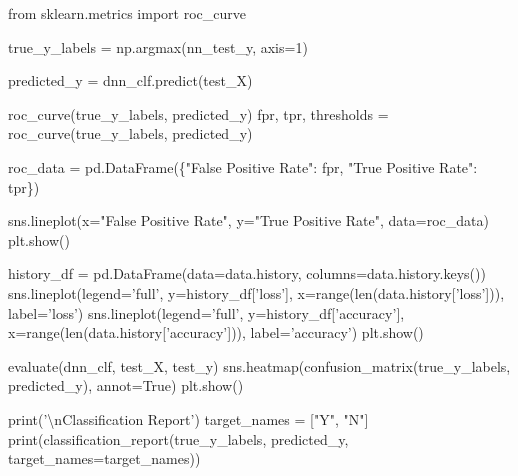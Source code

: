 \documentclass[]{article}
\newenvironment{Shaded}{}{}
\newcommand{\BuiltInTok}[1]{#1}
\newcommand{\CharTok}[1]{\textcolor[rgb]{0.25,0.44,0.63}{#1}}
\newcommand{\DecValTok}[1]{\textcolor[rgb]{0.25,0.63,0.44}{#1}}
\newcommand{\ImportTok}[1]{#1}
\newcommand{\NormalTok}[1]{#1}
\newcommand{\OperatorTok}[1]{\textcolor[rgb]{0.40,0.40,0.40}{#1}}
\newcommand{\StringTok}[1]{\textcolor[rgb]{0.25,0.44,0.63}{#1}}
\newcommand{\VariableTok}[1]{\textcolor[rgb]{0.10,0.09,0.49}{#1}}
\begin{document}
\begin{Shaded}
\begin{Highlighting}[]
\ImportTok{from}\NormalTok{ sklearn.metrics }\ImportTok{import}\NormalTok{ roc_curve}

\NormalTok{true_y_labels }\OperatorTok{=}\NormalTok{ np.argmax(nn_test_y, axis}\OperatorTok{=}\DecValTok{1}\NormalTok{) }

\NormalTok{predicted_y }\OperatorTok{=}\NormalTok{ dnn_clf.predict(test_X)}

\NormalTok{roc_curve(true_y_labels, predicted_y)}
\NormalTok{fpr, tpr, thresholds }\OperatorTok{=}\NormalTok{ roc_curve(true_y_labels, predicted_y)}

\NormalTok{roc_data }\OperatorTok{=}\NormalTok{ pd.DataFrame(\{}\StringTok{"False Positive Rate"}\NormalTok{: fpr, }\StringTok{"True Positive Rate"}\NormalTok{: tpr\})}

\NormalTok{sns.lineplot(x}\OperatorTok{=}\StringTok{"False Positive Rate"}\NormalTok{, y}\OperatorTok{=}\StringTok{"True Positive Rate"}\NormalTok{, data}\OperatorTok{=}\NormalTok{roc_data)}
\NormalTok{plt.show()}

\NormalTok{history_df }\OperatorTok{=}\NormalTok{ pd.DataFrame(data}\OperatorTok{=}\NormalTok{data.history, columns}\OperatorTok{=}\NormalTok{data.history.keys())}
\NormalTok{sns.lineplot(legend}\OperatorTok{=}\StringTok{'full'}\NormalTok{, y}\OperatorTok{=}\NormalTok{history_df[}\StringTok{'loss'}\NormalTok{], x}\OperatorTok{=}\BuiltInTok{range}\NormalTok{(}\BuiltInTok{len}\NormalTok{(data.history[}\StringTok{'loss'}\NormalTok{])), label}\OperatorTok{=}\StringTok{'loss'}\NormalTok{)}
\NormalTok{sns.lineplot(legend}\OperatorTok{=}\StringTok{'full'}\NormalTok{, y}\OperatorTok{=}\NormalTok{history_df[}\StringTok{'accuracy'}\NormalTok{], x}\OperatorTok{=}\BuiltInTok{range}\NormalTok{(}\BuiltInTok{len}\NormalTok{(data.history[}\StringTok{'accuracy'}\NormalTok{])), label}\OperatorTok{=}\StringTok{'accuracy'}\NormalTok{)}
\NormalTok{plt.show()}

\NormalTok{evaluate(dnn_clf, test_X, test_y)}
\NormalTok{sns.heatmap(confusion_matrix(true_y_labels, predicted_y), annot}\OperatorTok{=}\VariableTok{True}\NormalTok{)}
\NormalTok{plt.show()}

\BuiltInTok{print}\NormalTok{(}\StringTok{'}\CharTok{\textbackslash{}n}\StringTok{Classification Report'}\NormalTok{)}
\NormalTok{target_names }\OperatorTok{=}\NormalTok{ [}\StringTok{"Y"}\NormalTok{, }\StringTok{"N"}\NormalTok{]}
\BuiltInTok{print}\NormalTok{(classification_report(true_y_labels, predicted_y, target_names}\OperatorTok{=}\NormalTok{target_names))}
\end{Highlighting}
\end{Shaded}
\end{document}
